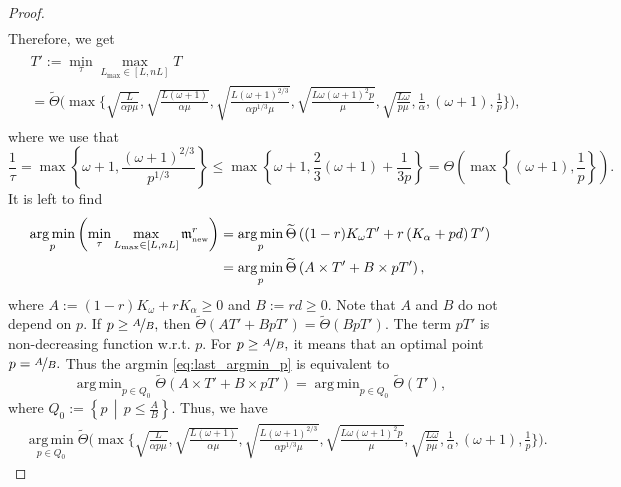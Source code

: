 \documentclass{article} %
\theoremstyle{plain}
\theoremstyle{definition}
\theoremstyle{remark}
\newcommand{\eqdef}{:=}
\DeclareMathOperator*{\argmin}{arg\,min}%
\begin{document}
\begin{proof}
\begin{align}
    \end{align} Therefore, we get
    \begin{eqnarray}
    \begin{aligned}
      \label{eq:t_prime}
      &T' \eqdef \min_{\tau} \max\limits_{L_{\max} \in [L, n L]} T \\
      &= \widetilde{\Theta}\Bigg(\max\Bigg\{\sqrt{\frac{L}{\alpha p \mu}},\sqrt{\frac{L (\omega + 1)}{\alpha \mu}},\sqrt{\frac{L (\omega + 1)^{2/3}}{\alpha p^{1/3} \mu}},\sqrt{\frac{L \omega (\omega + 1)^2 p}{\mu}}, \sqrt{\frac{L \omega}{p \mu}}, \frac{1}{\alpha}, (\omega + 1), \frac{1}{p}\Bigg\}\Bigg),
    \end{aligned}
    \end{eqnarray}
    where we use that $$\frac{1}{\tau} = \max\left\{\omega + 1, \frac{(\omega + 1)^{2/3}}{p^{1/3}}\right\} \leq \max\left\{\omega + 1, \frac{2}{3}\left(\omega + 1\right) + \frac{1}{3 p}\right\} = \Theta\left(\max\left\{\left(\omega + 1\right), \frac{1}{p}\right\}\right).$$
    It is left to find 
    \begin{align}
      \argmin_{p} \left(\min_{\tau}\max\limits_{L_{\max} \in [L, n L]} \mathfrak{m}^{r}_{{\scriptscriptstyle \textnormal{new}}}\right) &= \argmin_{p} \widetilde{\Theta} \left((1 - r)K_{\omega} T' + r \left(K_{\alpha} + p d\right) T'\right) \nonumber\\
      &= \argmin_{p} \widetilde{\Theta} \left(A \times T' + B \times p T'\right), \label{eq:last_argmin_p}
    \end{align}
    where $A \eqdef (1 - r)K_{\omega} + r K_{\alpha} \geq 0$ and $B \eqdef r d \geq 0.$ Note that $A$ and $B$ do not depend on $p.$ 
    If $p \geq \nicefrac{A}{B},$ then $\widetilde{\Theta} \left(A T' + B p T'\right) = \widetilde{\Theta} \left(B p T'\right).$ The term $p T'$ is non-decreasing function w.r.t. $p.$ For $p \geq \nicefrac{A}{B},$ it means that an optimal point $p = \nicefrac{A}{B}.$ Thus the argmin \eqref{eq:last_argmin_p} is equivalent to $$\argmin_{p \in Q_0} \widetilde{\Theta} \left(A \times T' + B \times p T'\right) = \argmin_{p \in Q_0} \widetilde{\Theta} \left(T'\right),$$ where $Q_0 \eqdef \left\{p\,\middle|\, p \leq \frac{A}{B}\right\}.$
    Thus, we have
    \begin{align*}
      &\argmin\limits_{p \in Q_0} \widetilde{\Theta}\Bigg(\max\Bigg\{\sqrt{\frac{L}{\alpha p \mu}},\sqrt{\frac{L (\omega + 1)}{\alpha \mu}},\sqrt{\frac{L (\omega + 1)^{2/3}}{\alpha p^{1/3} \mu}},\sqrt{\frac{L \omega (\omega + 1)^2 p}{\mu}}, \sqrt{\frac{L \omega}{p \mu}}, \frac{1}{\alpha}, (\omega + 1), \frac{1}{p}\Bigg\}\Bigg).

\end{align*}
\end{proof}
\end{document}
